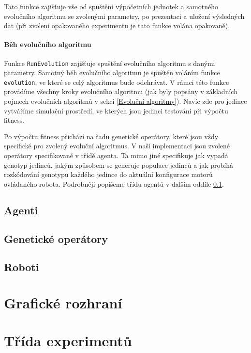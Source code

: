 Tato funkce zajišťuje vše od spuštění výpočetních jednotek a samotného
evolučního algoritmu se zvolenými parametry, po prezentaci a uložení
výsledných dat (při zvolení opakovaného experimentu je tato funkce volána
opakovaně).

\paragraph{Běh evolučního algoritmu}
Funkce \texttt{RunEvolution} zajišťuje spuštění evolučního algoritmu s danými
parametry. Samotný běh evolučního algoritmu je spuštěn voláním funkce
\texttt{evolution}, ve které se celý algoritmus bude odehrávat. V rámci této
funkce provádíme všechny kroky evolučního algoritmu (jak byly popsány v
základních pojmech evolučních algoritmů v sekci \ref{Evoluční algoritmy}).
Navíc zde pro jedince vytváříme simulační prostředí, ve kterých jsou jedinci
testování při výpočtu fitness.

Po výpočtu fitness přichází na řadu genetické operátory, které jsou vždy
specifické pro zvolený evoluční algoritmus. V naší implementaci jsou zvolené
operátory specifikované v třídě agenta. Ta mimo jiné specifikuje jak vypadá
genotyp jedinců, jakým způsobem se generuje populace jedinců a jak probíhá
rozkódování genotypu každého jedince do aktuální konfigurace motorů ovládaného
robota. Podrobněji popíšeme třídu agentů v dalším oddíle \ref{imp:gaAgents}.

\subsection{Agenti} \label{imp:gaAgents}

\subsection{Genetické operátory} \label{imp:gaMethods}

\subsection{Roboti} \label{imp:robots}

\section{Grafické rozhraní} \label{imp:GUI}

\section{Třída experimentů} \label{imp:experimentsetter}

